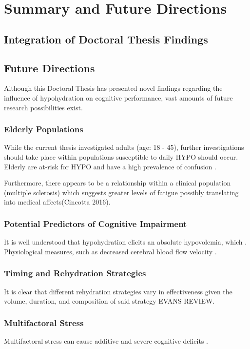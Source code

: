 \chapter{Summary and Future Directions}

\section{Integration of Doctoral Thesis Findings}


\section{Future Directions}

Although this Doctoral Thesis has presented novel findings regarding the influence of hypohydration on cognitive performance, vast amounts of future research possibilities exist. 

\subsection{Elderly Populations}

While the current thesis investigated adults (age: 18 - 45), further investigations should take place within populations susceptible to daily HYPO should occur. Elderly are at-risk for HYPO and have a high prevalence of confusion \cite{mentes_getting_1997}. 

Furthermore, there appears to be a relationship within a clinical population (multiple sclerosis) which suggests greater levels of fatigue possibly translating into medical affects(Cincotta 2016).


\subsection{Potential Predictors of Cognitive Impairment}

It is well understood that hypohydration elicits an absolute hypovolemia, which . Physiological measures, such as decreased cerebral blood flow velocity \cite{carter_hypohydration_2006}.

\subsection{Timing and Rehydration Strategies}

It is clear that different rehydration strategies vary in effectiveness given the volume, duration, and composition of said strategy  EVANS REVIEW. 

\subsection{Multifactoral Stress}

Multifactoral stress can cause additive and severe cognitive deficits \cite{lieberman_severe_2005}.